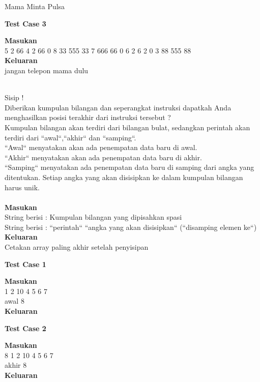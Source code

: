 \begin{permasalahan}{Mama Minta Pulsa}
	\begin{center}
	\textbf{Test Case 3}\\
	\end{center}
	\textbf{Masukan}\\
	5 2 66 4 2 66 0 8 33 555 33 7 666 66 0 6 2 6 2 0 3 88 555 88\\
	\textbf{Keluaran}\\
	jangan telepon mama dulu
	\\\\

\end{permasalahan}


\newpage

\begin{permasalahan}{Sisip !}\\
\label{prob:Sisip}
	Diberikan kumpulan bilangan dan seperangkat instruksi dapatkah Anda menghasilkan posisi terakhir dari instruksi tersebut ? \\
	Kumpulan bilangan akan terdiri dari bilangan bulat, sedangkan perintah akan terdiri dari ``awal``,``akhir`` dan ``samping``. \\
	``Awal`` menyatakan akan ada penempatan data baru di awal.\\
	``Akhir`` menyatakan akan ada penempatan data baru di akhir.\\
	``Samping`` menyatakan ada penempatan data baru di samping dari angka yang ditentukan.
	Setiap angka yang akan disisipkan ke dalam kumpulan bilangan harus unik. \\\\
	\textbf{Masukan}\\
	String berisi : Kumpulan bilangan yang dipisahkan spasi \\
	String berisi : ``perintah`` ``angka yang akan disisipkan`` (``disamping elemen ke``)\\
	\textbf{Keluaran}\\
	Cetakan array paling akhir setelah penyisipan\\
	\begin{center}
	\textbf{Test Case 1}\\
	\end{center}
	\textbf{Masukan}\\
	 1 2 10 4 5 6 7\\
   awal 8\\
	\textbf{Keluaran}\\
	\big[ 8, 1, 2, 10, 4, 5, 6, 7 \big]
	
	\begin{center}
	\textbf{Test Case 2}\\
	\end{center}
	\textbf{Masukan}\\
8 1 2 10 4 5 6 7\\
akhir 8\\
	\textbf{Keluaran}\\
	\big[8, 1, 2, 10, 4, 5, 6, 7\big]


\end{permasalahan}
